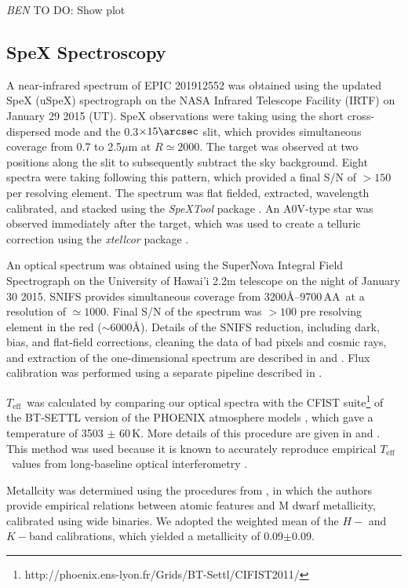 \documentclass{emulateapj}
\newcommand\teff{\ensuremath{T_\text{eff}}}
\newcommand{\todo}[3]{{\color{#2} \emph{#1} TO DO: #3}}
\newcommand{\btmtodo}[1]{\todo{BEN}{red}{#1}}
\begin{document}
\btmtodo{Show plot}



\subsection{SpeX Spectroscopy}
\label{Spexobs}


A near-infrared spectrum of EPIC 201912552 was obtained using the updated SpeX
(uSpeX) spectrograph \citep{Rayner03} on the NASA Infrared Telescope Facility
(IRTF) on January 29 2015 (UT).
SpeX observations were taking using the short cross-dispersed mode and the
0.3$\times15\arcsec$ slit, which provides simultaneous coverage from 0.7
to 2.5$\mu$m at $R\simeq2000$.
The target was observed at two positions along the slit to subsequently subtract
the sky background. Eight spectra were taking following this pattern, which provided
a final S/N of $>150$ per resolving element.
The spectrum was flat fielded, extracted, wavelength calibrated, and stacked
using the \textit{SpeXTool} package \citep{Cushing04}.
An A0V-type star was observed immediately after
the target, which was used to create a telluric correction using the
\textit{xtellcor} package \citep{Vacca03}.

An optical spectrum was obtained using the SuperNova Integral Field Spectrograph
\citep[SNIFS,][]{Aldering02,Lantz04} on the University of Hawai'i
2.2m telescope on the night of January 30 2015.
SNIFS provides simultaneous coverage from 3200\AA--9700\,AA\ at a resolution
of $\simeq1000$. Final S/N of the spectrum was $>100$ pre resolving element
in the red ($\sim6000$\AA).
Details of the SNIFS reduction, including dark, bias, and flat-field corrections,
cleaning the data of bad pixels and cosmic rays, and extraction of the
one-dimensional spectrum are described in \citet{Bacon01} and
\citet{Aldering06}.
Flux calibration was performed using a separate pipeline described in \citet{Mann15}.

\teff\ was calculated by comparing our optical spectra with the CFIST
suite\footnote{http://phoenix.ens-lyon.fr/Grids/BT-Settl/CIFIST2011/} of the BT-SETTL
version of the PHOENIX atmosphere models \citep{Allard13}, which gave a temperature
of 3503 $\pm$ 60\,K.
More details of this procedure are given in \citet{Mann14} and
\citet{Gaidos14}.
This method was used because it is known to accurately reproduce empirical
\teff\ values from long-baseline optical interferometry \citet{Boyajian12}.

Metallcity was determined using the procedures from \citet{Mann13a}, in which the
authors provide empirical relations between atomic features and M dwarf
metallicity, calibrated using wide binaries.
We adopted the weighted mean of the $H-$ and $K-$band calibrations,
which yielded a metallicity of 0.09$\pm$0.09.
\end{document}
